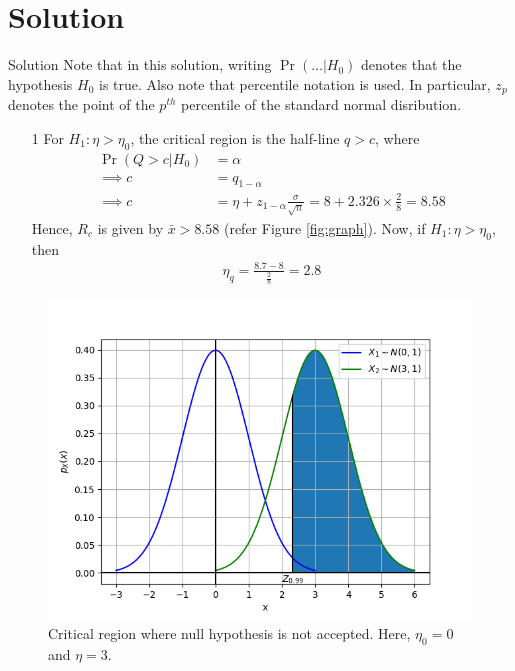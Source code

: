 \documentclass{beamer}
\providecommand{\pr}[1]{\ensuremath{\Pr\left(#1\right)}}
\begin{document}
\section{Solution}
\begin{frame}{Solution}
	Note that in this solution, writing $\pr{\ldots | H_0}$ denotes that the hypothesis $H_0$ is true. Also note that percentile notation is used. In particular, $z_p$ denotes the point of the $p^{th}$ percentile of the standard normal disribution.
	\begin{enumerate}
		\item[1] For $H_1: \eta > \eta_0$, the critical region is the half-line $q > c$, where 
			\begin{align}
				\pr{Q > c | H_0} &= \alpha \\
				\implies c &= q_{1 - \alpha} \\
				\implies c &= \eta + z_{1 - \alpha}\frac{\sigma}{\sqrt{n}} = 8 + 2.326 \times \frac{2}{8} = 8.58
				\label{eq:r-c}
			\end{align}
			Hence, $R_c$ is given by $\bar{x} > 8.58$ (refer Figure \eqref{fig:graph}). Now, if $H_1: \eta > \eta_0$, then
			\begin{align}
				\eta_q = \frac{8.7 - 8}{\frac{2}{8}} = 2.8
				\label{eq:new-eta}
			\end{align}
	\end{enumerate}
\end{frame}

\begin{frame}
	\begin{figure}
		\centering
		\includegraphics[height=0.8\textheight]{figs/14_1.png}
		\caption{Critical region where null hypothesis is not accepted. Here, $\eta_0 = 0$ and $\eta = 3$.}
		\label{fig:graph}
	\end{figure}
\end{frame}
\end{document}
